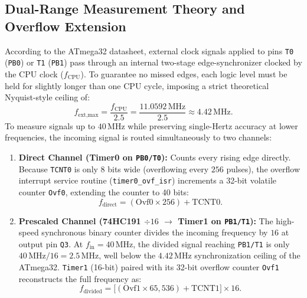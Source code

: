 \documentclass[11pt,a4paper]{article}
\begin{document}
\subsection{Dual-Range Measurement Theory and Overflow Extension}
According to the ATmega32 datasheet, external clock signals applied to pins \texttt{T0} (\texttt{PB0}) or \texttt{T1} (\texttt{PB1}) pass through an internal two-stage edge-synchronizer clocked by the CPU clock ($f_{\text{CPU}}$). To guarantee no missed edges, each logic level must be held for slightly longer than one CPU cycle, imposing a strict theoretical Nyquist-style ceiling of:
\begin{equation}
    f_{\text{ext,max}} = \frac{f_{\text{CPU}}}{2.5} = \frac{11.0592\,\text{MHz}}{2.5} \approx 4.42\,\text{MHz}.
\end{equation}
To measure signals up to $40\,\text{MHz}$ while preserving single-Hertz accuracy at lower frequencies, the incoming signal is routed simultaneously to two channels:
\begin{enumerate}[leftmargin=1.5em]
    \item \textbf{Direct Channel (Timer0 on \texttt{PB0/T0}):} Counts every rising edge directly. Because \texttt{TCNT0} is only 8 bits wide (overflowing every $256$ pulses), the overflow interrupt service routine (\texttt{timer0\_ovf\_isr}) increments a 32-bit volatile counter \texttt{Ovf0}, extending the counter to 40 bits:
    \begin{equation}
        f_{\text{direct}} = \left(\text{Ovf0} \times 256\right) + \text{TCNT0}.
    \end{equation}
    \item \textbf{Prescaled Channel (74HC191 $\div 16$ $\rightarrow$ Timer1 on \texttt{PB1/T1}):} The high-speed synchronous binary counter divides the incoming frequency by $16$ at output pin \texttt{Q3}. At $f_{\text{in}} = 40\,\text{MHz}$, the divided signal reaching \texttt{PB1/T1} is only $40\,\text{MHz} / 16 = 2.5\,\text{MHz}$, well below the $4.42\,\text{MHz}$ synchronization ceiling of the ATmega32. \texttt{Timer1} (16-bit) paired with its 32-bit overflow counter \texttt{Ovf1} reconstructs the full frequency as:
    \begin{equation}
        f_{\text{divided}} = \Big[\left(\text{Ovf1} \times 65{,}536\right) + \text{TCNT1}\Big] \times 16.
    \end{equation}
\end{enumerate}
\end{document}
